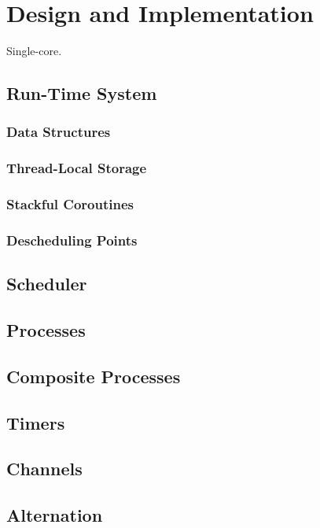 
\chapter{Design and Implementation}
\label{ch:design_implementation}

Single-core. 

\section{Run\hyp{}Time System}

\subsection{Data Structures}

\subsection{Thread\hyp{}Local Storage}

\subsection{Stackful Coroutines}

\subsection{Descheduling Points}


\section{Scheduler}


\section{Processes}


\section{Composite Processes}


\section{Timers}


\section{Channels}


\section{Alternation}

